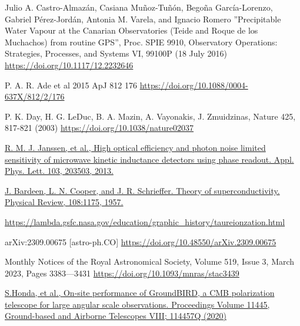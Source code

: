 \begin{thebibliography}{99}


Julio A. Castro-Almaz\'{a}n, Casiana Mu\~{n}oz-Tu\~{n}\'{o}n, Bego\~{n}a Garc\'{i}a-Lorenzo, Gabriel P\'{e}rez-Jord\'{a}n, Antonia M. Varela, and Ignacio Romero ”Precipitable Water Vapour at the Canarian Observatories (Teide and Roque de los Muchachos) from routine GPS”, Proc. SPIE 9910, Observatory Operations: Strategies, Processes, and Systems VI, 99100P (18 July 2016)
\href{https://doi.org/10.1117/12.2232646}{https://doi.org/10.1117/12.2232646}

P. A. R. Ade et al 2015 ApJ 812 176
\href{https://doi.org/10.1088/0004-637X/812/2/176}{https://doi.org/10.1088/0004-637X/812/2/176}

P. K. Day, H. G. LeDuc, B. A. Mazin, A. Vayonakis, J. Zmuidzinas, Nature 425,
817-821 (2003)
\href{https://doi.org/10.1038/nature02037}{https://doi.org/10.1038/nature02037}

\href{https://pubs.aip.org/aip/apl/article-abstract/103/20/203503/130528/High-optical-efficiency-and-photon-noise-limited?redirectedFrom=fulltext}{R. M. J. Janssen, et al., High optical efficiency and photon noise limited sensitivity of microwave kinetic inductance detectors using phase readout. Appl. Phys. Lett. 103, 203503, 2013.}

\href{https://journals.aps.org/pr/abstract/10.1103/PhysRev.108.1175}
{J. Bardeen, L. N. Cooper, and J. R. Schrieffer. Theory of superconductivity. Physical Review, 108:1175, 1957.}

\href{https://lambda.gsfc.nasa.gov/education/graphic\_history/taureionzation.html}{https://lambda.gsfc.nasa.gov/education/graphic\_history/taureionzation.html}

arXiv:2309.00675 [astro-ph.CO]
\href{https://doi.org/10.48550/arXiv.2309.00675}{https://doi.org/10.48550/arXiv.2309.00675}

Monthly Notices of the Royal Astronomical Society, Volume 519, Issue 3, March 2023, Pages 3383—3431
\href{https://doi.org/10.1093/mnras/stac3439}{https://doi.org/10.1093/mnras/stac3439}

\href{https://www.spiedigitallibrary.org/conference-proceedings-of-spie/11445/114457Q/On-site-performance-of-GroundBIRD-a-CMB-polarization-telescope-for/10.1117/12.2560918.short}
{S.Honda, et al., On-site performance of GroundBIRD, a CMB polarization telescope for large angular scale observations. Proceedings Volume 11445, Ground-based and Airborne Telescopes VIII; 114457Q (2020)}


\end{thebibliography}
